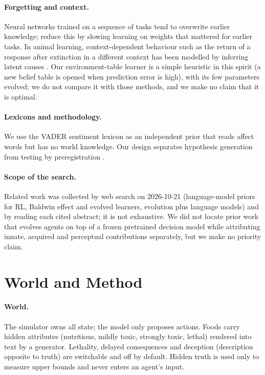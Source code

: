 \documentclass[11pt]{article}
\begin{document}
\paragraph{Forgetting and context.} Neural networks trained on a sequence of tasks tend to overwrite earlier knowledge; \citet{kirkpatrick2017overcoming} reduce this by slowing learning on weights that mattered for earlier tasks. In animal learning, context-dependent behaviour such as the return of a response after extinction in a different context has been modelled by inferring latent causes \citep{gershman2010context}. Our environment-table learner is a simple heuristic in this spirit (a new belief table is opened when prediction error is high), with its few parameters evolved; we do not compare it with those methods, and we make no claim that it is optimal.

\paragraph{Lexicons and methodology.} We use the VADER sentiment lexicon \citep{hutto2014vader} as an independent prior that reads affect words but has no world knowledge. Our design separates hypothesis generation from testing by preregistration \citep{nosek2018preregistration}.

\paragraph{Scope of the search.} Related work was collected by web search on 2026-10-21 (language-model priors for RL, Baldwin effect and evolved learners, evolution plus language models) and by reading each cited abstract; it is not exhaustive. We did not locate prior work that evolves agents on top of a frozen pretrained decision model while attributing innate, acquired and perceptual contributions separately, but we make no priority claim.

\section{World and Method}
\paragraph{World.} The simulator owns all state; the model only proposes actions. Foods carry hidden attributes (nutritious, mildly toxic, strongly toxic, lethal) rendered into text by a generator. Lethality, delayed consequences and deception (description opposite to truth) are switchable and off by default. Hidden truth is used only to measure upper bounds and never enters an agent's input.
\end{document}
